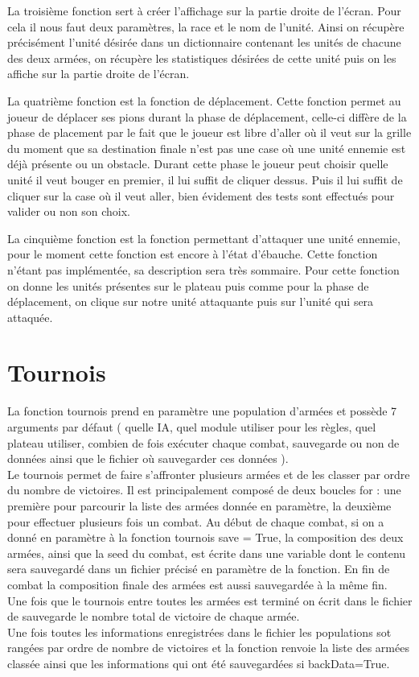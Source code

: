 \documentclass{article}
\begin{document}
	La troisième fonction sert à créer l'affichage sur la partie droite de l'écran. Pour cela il nous faut deux paramètres, la race et le nom de l'unité. Ainsi on récupère précisément l'unité désirée dans un dictionnaire contenant les unités de chacune des deux armées, on récupère les statistiques désirées de cette unité puis on les affiche sur la partie droite de l'écran.
	
	La quatrième fonction est la fonction de déplacement. Cette fonction permet au joueur de déplacer ses pions durant la phase de déplacement, celle-ci diffère de la phase de placement par le fait que le joueur est libre d'aller où il veut sur la grille du moment que sa destination finale n'est pas une case où une unité ennemie est déjà présente ou un obstacle. Durant cette phase le joueur peut choisir quelle unité il veut bouger en premier, il lui suffit de cliquer dessus. Puis il lui suffit de cliquer sur la case où il veut aller, bien évidement des tests sont effectués pour valider ou non son choix.
	
	La cinquième fonction est la fonction permettant d'attaquer une unité ennemie, pour le moment cette fonction est encore à l'état d'ébauche. Cette fonction n'étant pas implémentée, sa description sera très sommaire. Pour cette fonction on donne les unités présentes sur le plateau puis comme pour la phase de déplacement, on clique sur notre unité attaquante puis sur l'unité qui sera attaquée.


\newpage

\section{Tournois}
La fonction tournois prend en paramètre une population d'armées et possède 7 arguments par défaut ( quelle IA, quel module utiliser pour les règles, quel plateau utiliser, combien de fois exécuter chaque combat, sauvegarde ou non de données ainsi que le fichier où sauvegarder ces données ). \\
Le tournois permet de faire s'affronter plusieurs armées et de les classer par ordre du nombre de victoires. Il est principalement composé de deux boucles for : une première pour parcourir la liste des armées donnée en paramètre, la deuxième pour effectuer plusieurs fois un combat. Au début de chaque combat, si on a donné en paramètre à la fonction tournois save = True, la composition des deux armées, ainsi que la seed du combat, est écrite dans une variable dont le contenu sera sauvegardé dans un fichier précisé en paramètre de la fonction. En fin de combat la composition finale des armées est aussi sauvegardée à la même fin.\\
Une fois que le tournois entre toutes les armées est terminé on écrit dans le fichier de sauvegarde le nombre total de victoire de chaque armée. \\
Une fois toutes les informations enregistrées dans le fichier les populations sot rangées par ordre de nombre de victoires et la fonction renvoie la liste des armées classée ainsi que les informations qui ont été sauvegardées si backData=True.
\end{document}
